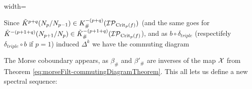 \begin{corollary}
\begin{fdiagram}
\begin{adjustbox}{width=\textwidth}
		\end{adjustbox}
	\end{fdiagram}
	Since $\tilde{K}^{p+q}(N_p\slash N_{p-1})\in K^{-(p+q)}_{\#}(\mathcal{IP}_{\mathrm{Crit}_p(f)})$ (and the same goes for $\tilde{K}^{-(p+1+q)}(N_{p+1}\slash N_{p})\in \tilde{K}_{\#}^{-(p+1+q)}(\mathcal{IP}_{\mathrm{Crit}_p(f)}$), and as $b\circ \delta_{triple}$ (respectifely $\delta_{triple}\circ b$ if $p=1$) induced $\Delta^k$ we have the commuting diagram
	\begin{center}
	\end{center}The Morse coboundary appears, as $\beta_{\#}$ and $\beta'_{\#}$ are inverses of the map $\mathcal{X}$ from Theorem \ref{eq:morseFilt-commutingDiagramTheorem}. This all lets us define a new spectral sequence:
\end{corollary}


